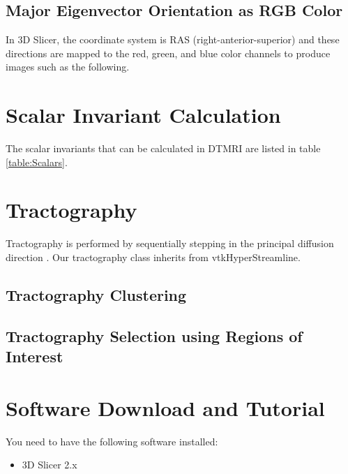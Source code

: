 \documentclass{InsightArticle}
\begin{document}
\begin{figure}
\center
\label{fig:GlyphLineLinear}
\end{figure}




\subsection{Major Eigenvector Orientation as RGB Color}

In 3D Slicer, the coordinate system is RAS (right-anterior-superior)
and these directions are mapped to the red, green, and blue color
channels \cite{pajevic99} to produce images such as the following.


\section{Scalar Invariant Calculation}
The scalar invariants that can be calculated in DTMRI are listed in table \ref{table:Scalars}.

\section{Tractography}
Tractography is performed by sequentially stepping in the principal
diffusion direction \cite{basser00,conturo99,mori99,westin99}.  Our
tractography class inherits from vtkHyperStreamline.

\subsection{Tractography Clustering}
\subsection{Tractography Selection using Regions of Interest}


\section{Software Download and Tutorial}

You need to have the following software installed:

\begin{itemize}
  \item  3D Slicer 2.x
\end{itemize}
\end{document}
